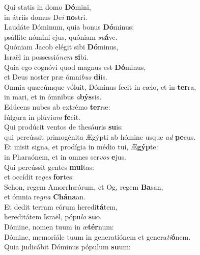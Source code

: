 \evenverse Qui statis in domo \textbf{Dó}mini,~\*\\
\evenverse in átriis domus De\textit{i} \textbf{no}stri.\\
\oddverse Laudáte Dóminum, quia bonus \textbf{Dó}minus:~\*\\
\oddverse psállite nómini ejus, quóniam \textit{su}\textbf{á}ve.\\
\evenverse Quóniam Jacob elégit sibi \textbf{Dó}minus,~\*\\
\evenverse Israël in possessió\textit{nem} \textbf{si}bi.\\
\oddverse Quia ego cognóvi quod magnus est \textbf{Dó}minus,~\*\\
\oddverse et Deus noster præ ómni\textit{bus} \textbf{di}is.\\
\evenverse Omnia quæcúmque vóluit, Dóminus fecit in cælo, et in \textbf{ter}ra,~\*\\
\evenverse in mari, et in ómnibus \textit{a}\textbf{býs}sis.\\
\oddverse Edúcens nubes ab extrémo \textbf{ter}ræ:~\*\\
\oddverse fúlgura in plúvi\textit{am} \textbf{fe}cit.\\
\evenverse Qui prodúcit ventos de thesáuris \textbf{su}is:~\*\\
\evenverse qui percússit primogénita Ægýpti ab hómine usque \textit{ad} \textbf{pe}cus.\\
\oddverse Et misit signa, et prodígia in médio tui, Æ\textbf{gýp}te:~\*\\
\oddverse in Pharaónem, et in omnes ser\textit{vos} \textbf{e}jus.\\
\evenverse Qui percússit gentes \textbf{mul}tas:~\*\\
\evenverse et occídit re\textit{ges} \textbf{for}tes:\\
\oddverse Sehon, regem Amorrhæórum, et Og, regem \textbf{Ba}san,~\*\\
\oddverse et ómnia re\textit{gna} \textbf{Chá}\textbf{na}an.\\
\evenverse Et dedit terram eórum heredi\textbf{tá}tem,~\*\\
\evenverse hereditátem Israël, pópu\textit{lo} \textbf{su}o.\\
\oddverse Dómine, nomen tuum in æ\textbf{tér}num:~\*\\
\oddverse Dómine, memoriále tuum in generatiónem et genera\textit{ti}\textbf{ó}nem.\\
\evenverse Quia judicábit Dóminus pópulum \textbf{su}um:~\*\\
